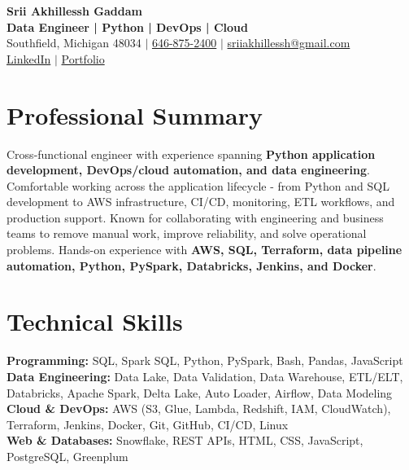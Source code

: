 \documentclass[letterpaper,10pt]{article}
\begin{document}
\fontsize{9.35pt}{10.45pt}\selectfont

\begin{center}
    {\LARGE \textbf{Srii Akhillessh Gaddam}} \\[-1pt]
    \textbf{Data Engineer | Python | DevOps | Cloud} \\[2pt]
    Southfield, Michigan 48034 $|$
    \href{tel:6468752400}{646-875-2400} $|$
    \href{mailto:sriiakhillessh@gmail.com}{sriiakhillessh@gmail.com} \\[1pt]
    \href{https://www.linkedin.com/in/srii-akhiilessh-gaddam-b48668191/}{LinkedIn} $|$
    \href{https://sriiakhillesshg.github.io/portfolio/}{Portfolio}
\end{center}
\vspace{-8pt}

\section{Professional Summary}
\small{Cross-functional engineer with experience spanning \textbf{Python application development, DevOps/cloud automation, and data engineering}. Comfortable working across the application lifecycle - from Python and SQL development to AWS infrastructure, CI/CD, monitoring, ETL workflows, and production support. Known for collaborating with engineering and business teams to remove manual work, improve reliability, and solve operational problems. Hands-on experience with \textbf{AWS, SQL, Terraform, data pipeline automation, Python, PySpark, Databricks, Jenkins, and Docker}.}

\section{Technical Skills}
\small{
\textbf{Programming:} SQL, Spark SQL, Python, PySpark, Bash, Pandas, JavaScript \\
\textbf{Data Engineering:} Data Lake, Data Validation, Data Warehouse, ETL/ELT, Databricks, Apache Spark, Delta Lake, Auto Loader, Airflow, Data Modeling \\
\textbf{Cloud \& DevOps:} AWS (S3, Glue, Lambda, Redshift, IAM, CloudWatch), Terraform, Jenkins, Docker, Git, GitHub, CI/CD, Linux \\
\textbf{Web \& Databases:} Snowflake, REST APIs, HTML, CSS, JavaScript, PostgreSQL, Greenplum
}
\end{document}
